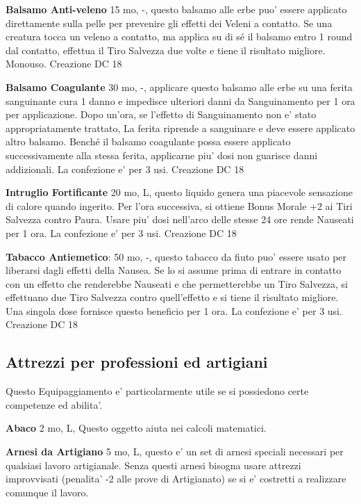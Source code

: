\documentclass[a4paper,11pt,twoside,openany]{book}
\begin{document}
{		\textbf{Balsamo Anti-veleno} 15 mo, -, questo balsamo alle erbe puo' essere applicato direttamente sulla pelle per prevenire gli effetti dei Veleni a contatto. Se una creatura tocca un veleno a contatto, ma applica su di sé il balsamo entro 1 round dal contatto, effettua il Tiro Salvezza due volte e tiene il risultato migliore. Monouso. Creazione DC 18
		
		\textbf{Balsamo Coagulante} 30 mo, -, applicare questo balsamo alle erbe su una ferita sanguinante cura 1 danno e impedisce ulteriori danni da Sanguinamento per 1 ora per applicazione. Dopo un'ora, se l'effetto di Sanguinamento non e' stato appropriatamente trattato, 
		La ferita riprende a sanguinare e deve essere applicato altro balsamo. Benché il balsamo coagulante possa essere applicato successivamente alla stessa ferita, applicarne piu' dosi non guarisce danni addizionali. La confezione e' per 3 usi. Creazione DC 18
		
		\textbf{Intruglio Fortificante} 20 mo, L, questo liquido genera una piacevole sensazione di calore quando ingerito. Per l'ora successiva, si ottiene Bonus Morale +2 ai Tiri Salvezza contro Paura. Usare piu' dosi nell'arco delle stesse 24 ore rende Nauseati per 1 ora. La confezione e' per 3 usi. Creazione DC 18
		
		\textbf{Tabacco Antiemetico}: 50 mo, -, questo tabacco da fiuto puo' essere usato per liberarsi dagli effetti della Nausea. Se lo si assume prima di entrare in contatto con un effetto che renderebbe Nauseati e che permetterebbe un Tiro Salvezza, si effettuano due Tiro Salvezza contro quell'effetto e si tiene il risultato migliore. Una singola dose fornisce questo beneficio per 1 ora. La confezione e’ per 3 usi. Creazione DC 18
		
		\pagebreak
		
		\subsection{Attrezzi per professioni ed artigiani}
		
		\label{attrezzi-per-professioni-ed-artigiani}
		
		Questo Equipaggiamento e' particolarmente utile se si possiedono certe competenze ed abilita'.
		
		\textbf{Abaco} 2 mo, L, Questo oggetto aiuta nei calcoli matematici.
		
		\textbf{Arnesi da Artigiano} 5 mo, L, questo e' un set di arnesi speciali necessari per qualsiasi lavoro artigianale. Senza questi arnesi bisogna usare attrezzi improvvisati (penalita' -2 alle prove di Artigianato) se si e' costretti a realizzare comunque il lavoro.
		
}
\end{document}
